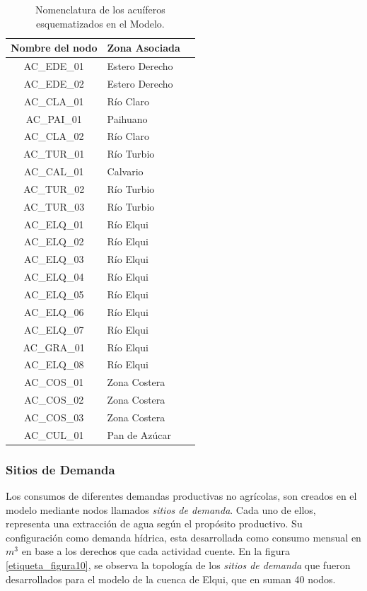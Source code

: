\documentclass[11pt,]{article}
\begin{document}
\begin{table}[H]
\centering
\caption{Nomenclatura de los acuíferos esquematizados en el Modelo.}
\label{tabla6}
\begin{tabular}{@{}cll@{}}
\toprule
\multicolumn{1}{c}{\textbf{Nombre del nodo}} & \multicolumn{1}{c}{\textbf{Zona Asociada}} \\ \midrule
  AC\_EDE\_01 & Estero Derecho \\
  AC\_EDE\_02 & Estero Derecho \\
  AC\_CLA\_01 & Río Claro \\
  AC\_PAI\_01 & Paihuano \\
  AC\_CLA\_02 & Río Claro \\
  AC\_TUR\_01 & Río Turbio \\
  AC\_CAL\_01 & Calvario \\
  AC\_TUR\_02 & Río Turbio \\
  AC\_TUR\_03 & Río Turbio \\
  AC\_ELQ\_01 & Río Elqui \\
  AC\_ELQ\_02 & Río Elqui \\
  AC\_ELQ\_03 & Río Elqui \\
  AC\_ELQ\_04 & Río Elqui \\
  AC\_ELQ\_05 & Río Elqui \\
  AC\_ELQ\_06 & Río Elqui \\
  AC\_ELQ\_07 & Río Elqui \\
  AC\_GRA\_01 & Río Elqui \\
  AC\_ELQ\_08 & Río Elqui \\
  AC\_COS\_01 & Zona Costera \\
  AC\_COS\_02 & Zona Costera \\
  AC\_COS\_03 & Zona Costera \\
  AC\_CUL\_01 & Pan de Azúcar \\ \bottomrule
\end{tabular}
\end{table}

\subsubsection{Sitios de Demanda}\bigskip

Los consumos de diferentes demandas productivas no agrícolas, son creados en el modelo mediante nodos llamados \textit{sitios de demanda}. Cada uno de ellos, representa una extracción de agua según el propósito productivo. Su configuración como demanda hídrica, esta desarrollada como consumo mensual en $m^3$ en base a los derechos que cada actividad cuente. En la figura \ref{etiqueta_figura10}, se observa la topología de los \textit{sitios de demanda} que fueron desarrollados para el modelo de la cuenca de Elqui, que en suman 40 nodos.\\
 
\end{document}
